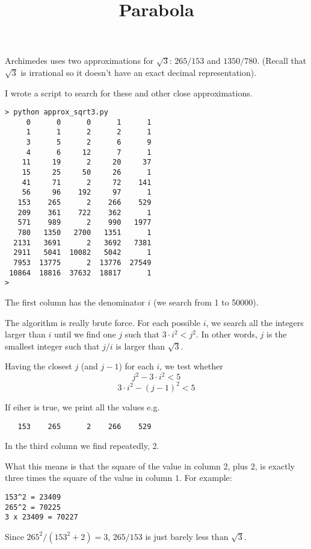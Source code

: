 \documentclass[11pt, oneside]{article}
\title{Parabola}
\date{}
\begin{document}
\maketitle
\Large


Archimedes uses two approximations for $\sqrt{3}$:  $265/153$  and $1350/780$. (Recall that $\sqrt{3}$ is irrational so it doesn't have an exact decimal representation). 

I wrote a script to search for these and other close approximations.

\begin{verbatim}
> python approx_sqrt3.py 
     0      0      0      1      1
     1      1      2      2      1
     3      5      2      6      9
     4      6     12      7      1
    11     19      2     20     37
    15     25     50     26      1
    41     71      2     72    141
    56     96    192     97      1
   153    265      2    266    529
   209    361    722    362      1
   571    989      2    990   1977
   780   1350   2700   1351      1
  2131   3691      2   3692   7381
  2911   5041  10082   5042      1
  7953  13775      2  13776  27549
 10864  18816  37632  18817      1
> 
\end{verbatim}
The first column has the denominator $i$ (we search from 1 to 50000).  

The algorithm is really brute force.  For each possible $i$, we search all the integers larger than $i$ until we find one $j$ such that $3 \cdot i^2 < j^2$.  In other words, $j$ is the smallest integer such that $j/i$ is larger than $\sqrt{3}$.  

Having the closest $j$ (and $j-1$) for each $i$, we test whether
\[ j^2 - 3 \cdot i^2 < 5 \]
\[ 3 \cdot i^2 - (j-1)^2 < 5 \]

If eiher is true, we print all the values e.g.
\begin{verbatim}
   153    265      2    266    529
\end{verbatim}

In the third column we find repeatedly, 2.  

What this means is that the square of the value in column 2, plus $2$, is exactly three times the square of the value in column $1$.  For example:

\begin{verbatim}
153^2 = 23409
265^2 = 70225
3 x 23409 = 70227
\end{verbatim}
Since $265^2 / (153^2 + 2) = 3$,  $265/153$ is just barely less than $\sqrt{3}$.
\end{document}
